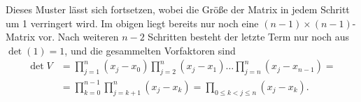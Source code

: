 \documentclass[english, parskip=full]{scrartcl}
\begin{document}
Dieses Muster lässt sich fortsetzen, wobei die Größe der Matrix in jedem Schritt um 1 verringert wird. 
Im obigen liegt bereits nur noch eine $(n-1)\times(n-1)$-Matrix vor.
Nach weiteren $n-2$ Schritten besteht der letzte Term nur noch aus $\det (1)=1$, und die gesammelten Vorfaktoren sind
\begin{align}
\det V&=\prod_{j=1}^n (x_j-x_0)\prod_{j=2}^n (x_j-x_1)\dots\prod_{j=n}^n (x_j-x_{n-1})=\\
&=\prod_{k=0}^{n-1}\prod_{j=k+1}^n(x_j-x_k)=\prod_{0\le k<j\le n}(x_j-x_k).\label{eqn:Vandermande determinant}
\end{align}
\newpage
\end{document}
